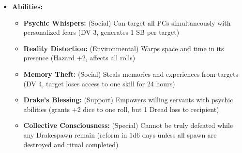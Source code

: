 \documentclass[11pt]{article}
\begin{document}
\begin{itemize}
  \item \textbf{Abilities:}
    \begin{itemize}
    \item \textbf{Psychic Whispers:} (Social) Can target all PCs simultaneously with personalized fears (DV 3, generates 1 SB per target)
    \item \textbf{Reality Distortion:} (Environmental) Warps space and time in its presence (Hazard +2, affects all rolls)
    \item \textbf{Memory Theft:} (Social) Steals memories and experiences from targets (DV 4, target loses access to one skill for 24 hours)
    \item \textbf{Drake's Blessing:} (Support) Empowers willing servants with psychic abilities (grants +2 dice to one roll, but 1 Dread loss to recipient)
    \item \textbf{Collective Consciousness:} (Special) Cannot be truly defeated while any Drakespawn remain (reform in 1d6 days unless all spawn are destroyed and ritual completed)
    \end{itemize}
\end{itemize}
\end{document}
